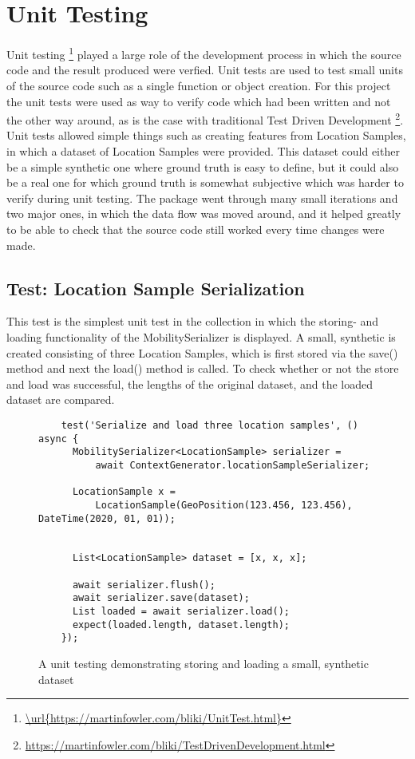 \section{Unit Testing}
Unit testing \footnote{\url{\url{https://martinfowler.com/bliki/UnitTest.html}}} played a large role of the development process in which the source code and the result produced were verfied. Unit tests are used to test small units of the source code such as a single function or object creation. For this project the unit tests were used as way to verify code which had been written and not the other way around, as is the case with traditional Test Driven Development \footnote{
\url{https://martinfowler.com/bliki/TestDrivenDevelopment.html}}. Unit tests allowed simple things such as creating features from Location Samples, in which a dataset of Location Samples were provided. This dataset could either be a simple synthetic one where ground truth is easy to define, but it could also be a real one for which ground truth is somewhat subjective which was harder to verify during unit testing.  The package went through many small iterations and two major ones, in which the data flow was moved around, and it helped greatly to be able to check that the source code still worked every time changes were made.

\subsection{Test: Location Sample Serialization}
This test is the simplest unit test in the collection in which the storing- and loading functionality of the MobilitySerializer is displayed. A small, synthetic is created consisting of three Location Samples, which is first stored via the save() method and next the load() method is called. To check whether or not the store and load was successful, the lengths of the original dataset, and the loaded dataset are compared. 

\begin{figure}
    \centering
    \begin{verbatim}
    test('Serialize and load three location samples', () async {
      MobilitySerializer<LocationSample> serializer =
          await ContextGenerator.locationSampleSerializer;

      LocationSample x =
          LocationSample(GeoPosition(123.456, 123.456), DateTime(2020, 01, 01));


      List<LocationSample> dataset = [x, x, x];

      await serializer.flush();
      await serializer.save(dataset);
      List loaded = await serializer.load();
      expect(loaded.length, dataset.length);
    });
    \end{verbatim}
    \caption{A unit testing demonstrating storing and loading a small, synthetic dataset}
    \label{fig:my_label}
\end{figure}


